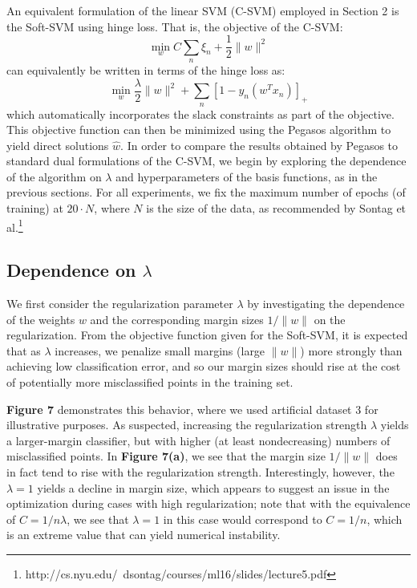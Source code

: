 \documentclass[10pt,psamsfonts]{amsart}
\theoremstyle{definition}
\theoremstyle{remark}
\numberwithin{equation}{section}
\begin{document}
An equivalent formulation of the linear SVM (C-SVM) employed in Section 2 is the Soft-SVM using hinge loss. That is, the objective of the C-SVM:
$$\min_w C \sum_n \xi_n+ \frac{1}{2}\|w\|^2$$
can equivalently be written in terms of the hinge loss as:
$$\min_w \frac{\lambda}{2} \|w\|^2  + \sum_n [1-y_n(w^Tx_n)]_+$$
which automatically incorporates the slack constraints as part of the objective. This objective function can then be minimized using the Pegasos algorithm to yield direct solutions $\hat{w}$. In order to compare the results obtained by Pegasos to standard dual formulations of the C-SVM, we begin by exploring the dependence of the algorithm on $\lambda$ and hyperparameters of the basis functions, as in the previous sections. For all experiments, we fix the maximum number of epochs (of training) at $20 \cdot N$, where $N$ is the size of the data, as recommended by Sontag et al.\footnote{http://cs.nyu.edu/~dsontag/courses/ml16/slides/lecture5.pdf}

\subsection{Dependence on $\lambda$} We first consider the regularization parameter $\lambda$ by investigating the dependence of the weights $w$ and the corresponding margin sizes $1/\|w\|$ on the regularization. From the objective function given for the Soft-SVM, it is expected that as $\lambda$ increases, we penalize small margins (large $\|w\|$) more strongly than achieving low classification error, and so our margin sizes should rise at the cost of potentially more misclassified points in the training set.

{\bf Figure 7} demonstrates this behavior, where we used artificial dataset 3 for illustrative purposes. As suspected, increasing the regularization strength $\lambda$ yields a larger-margin classifier, but with higher (at least nondecreasing) numbers of misclassified points. In {\bf Figure 7(a)}, we see that the margin size $1/\|w\|$ does in fact tend to rise with the regularization strength. Interestingly, however, the $\lambda = 1$ yields a decline in margin size, which appears to suggest an issue in the optimization during cases with high regularization; note that with the equivalence of $C = 1/n\lambda$, we see that $\lambda = 1$ in this case would correspond to $C = 1/n$, which is an extreme value that can yield numerical instability.
\end{document}
